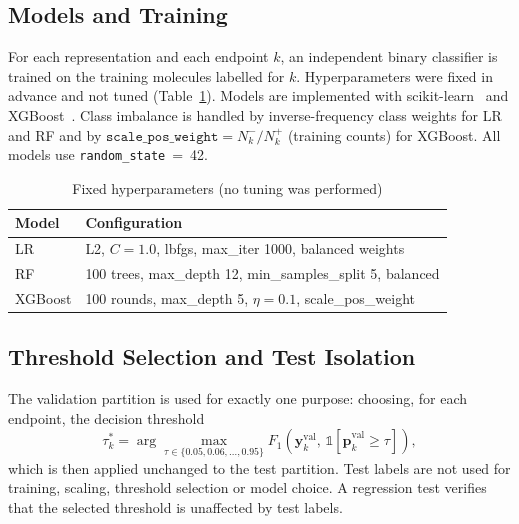 \documentclass[conference]{IEEEtran}
\begin{document}
\subsection{Models and Training}
For each representation and each endpoint $k$, an independent binary classifier is trained on the training molecules labelled for $k$. Hyperparameters were fixed in advance and not tuned (Table~\ref{tab:hparams}). Models are implemented with scikit-learn~\cite{pedregosa2011scikit} and XGBoost~\cite{chen2016xgboost}. Class imbalance is handled by inverse-frequency class weights for LR and RF and by $\texttt{scale\_pos\_weight}=N^{-}_{k}/N^{+}_{k}$ (training counts) for XGBoost. All models use \texttt{random\_state}~=~42.

\begin{table}[t]
\caption{Fixed hyperparameters (no tuning was performed)}
\label{tab:hparams}
\centering
\footnotesize
\begin{tabular}{ll}
\toprule
Model & Configuration\\
\midrule
LR      & L2, $C=1.0$, lbfgs, max\_iter 1000, balanced weights\\
RF      & 100 trees, max\_depth 12, min\_samples\_split 5, balanced\\
XGBoost & 100 rounds, max\_depth 5, $\eta=0.1$, scale\_pos\_weight\\
\bottomrule
\end{tabular}
\end{table}

\subsection{Threshold Selection and Test Isolation}
The validation partition is used for exactly one purpose: choosing, for each endpoint, the decision threshold
\begin{equation}
\tau_k^{*}=\arg\max_{\tau\in\{0.05,0.06,\ldots,0.95\}} F_1\!\left(\mathbf{y}^{\mathrm{val}}_{k},\,\mathbb{1}[\hat{\mathbf{p}}^{\mathrm{val}}_{k}\ge\tau]\right),
\end{equation}
which is then applied unchanged to the test partition. Test labels are not used for training, scaling, threshold selection or model choice. A regression test verifies that the selected threshold is unaffected by test labels.

\end{document}
